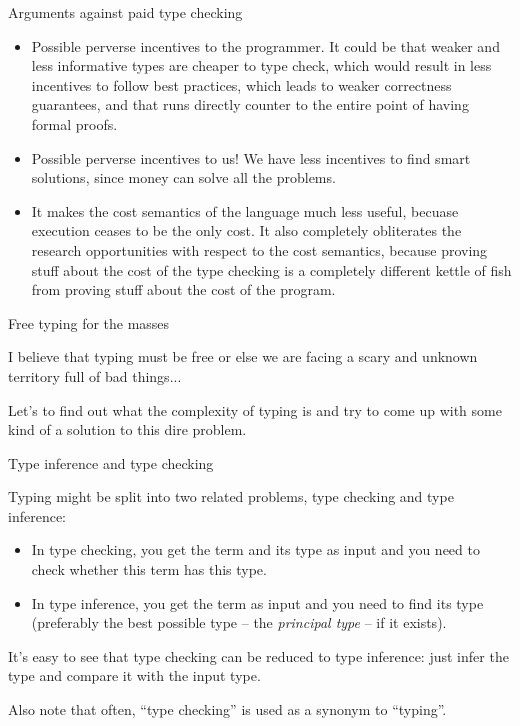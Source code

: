 \documentclass{beamer}
\begin{document}
\begin{frame}{Arguments against paid type checking}

\begin{itemize}
  \item Possible perverse incentives to the programmer. It could be that weaker and less informative types are cheaper to type check, which would result in less incentives to follow best practices, which leads to weaker correctness guarantees, and that runs directly counter to the entire point of having formal proofs.
  \item Possible perverse incentives to us! We have less incentives to find smart solutions, since money can solve all the problems.
  \item It makes the cost semantics of the language much less useful, becuase execution ceases to be the only cost. It also completely obliterates the research opportunities with respect to the cost semantics, because proving stuff about the cost of the type checking is a completely different kettle of fish from proving stuff about the cost of the program.
\end{itemize}

\end{frame}

\begin{frame}{Free typing for the masses}

I believe that typing must be free or else we are facing a scary and unknown territory full of bad things...

\vspace{2em}

Let's to find out what the complexity of typing is and try to come up with some kind of a solution to this dire problem.

\end{frame}

\begin{frame}{Type inference and type checking}

Typing might be split into two related problems, type checking and type inference:

\begin{itemize}
  \item In type checking, you get the term and its type as input and you need to check whether this term has this type.
  \item In type inference, you get the term as input and you need to find its type (preferably the best possible type -- the \textit{principal type} -- if it exists).
\end{itemize}

\vspace{2em}

It's easy to see that type checking can be reduced to type inference: just infer the type and compare it with the input type.

\vspace{2em}

Also note that often, ``type checking'' is used as a synonym to ``typing''.

\end{frame}
\end{document}
